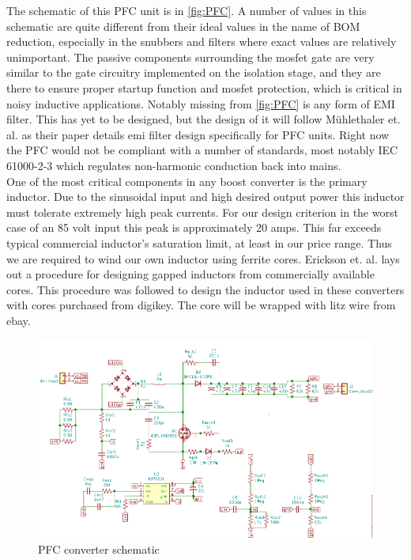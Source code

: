 \documentclass[12pt]{article}
\begin{document}
The schematic of this PFC unit is in \autoref{fig:PFC}. A number of values in this schematic are quite different from their ideal values in the name of BOM reduction, especially in the snubbers and filters where exact values are relatively unimportant. The passive components surrounding the mosfet gate are very similar to the gate circuitry implemented on the isolation stage, and they are there to ensure proper startup function and mosfet protection, which is critical in noisy inductive applications. Notably missing from \autoref{fig:PFC} is any form of EMI filter. This has yet to be designed, but the design of it will follow Mühlethaler et. al.\cite{8} as their paper details emi filter design specifically for PFC units. Right now the PFC would not be compliant with a number of standards, most notably IEC 61000-2-3 \cite{3} which regulates non-harmonic conduction back into mains.\\

One of the most critical components in any boost converter is the primary inductor. Due to the sinusoidal input and high desired output power this inductor must tolerate extremely high peak currents. For our design criterion in the worst case of an 85 volt input this peak is approximately 20 amps. This far exceeds typical commercial inductor’s saturation limit, at least in our price range. Thus we are required to wind our own inductor using ferrite cores. Erickson et. al.\cite{2} lays out a procedure for designing gapped inductors from commercially available cores. This procedure was followed to design the inductor used in these converters with cores purchased from digikey. The core will be wrapped with litz wire from ebay.\\

\begin{figure}[H]
    \includegraphics[width=\textwidth]{pfcschema}
    \caption{PFC converter schematic}
    \label{fig:PFC}
\end{figure}
\end{document}
